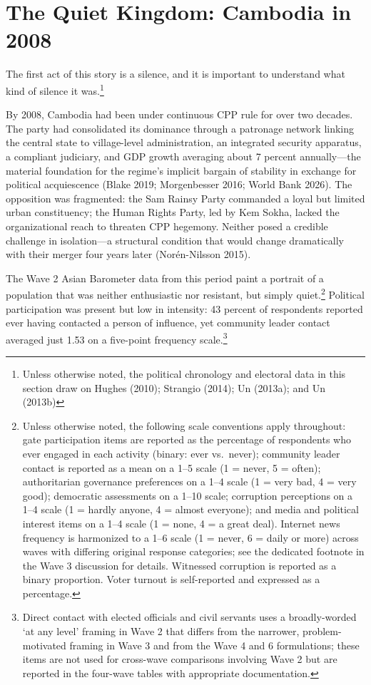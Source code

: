 \documentclass[Review,times,sageh,doublespace]{sagej}
\begin{document}
\section{The Quiet Kingdom: Cambodia in
2008}\label{the-quiet-kingdom-cambodia-in-2008}

The first act of this story is a silence, and it is important to
understand what kind of silence it was.\footnote{Unless otherwise noted,
  the political chronology and electoral data in this section draw on
  Hughes (2010); Strangio (2014); Un (2013a); and Un (2013b)}

By 2008, Cambodia had been under continuous CPP rule for over two
decades. The party had consolidated its dominance through a patronage
network linking the central state to village-level administration, an
integrated security apparatus, a compliant judiciary, and GDP growth
averaging about 7 percent annually---the material foundation for the
regime's implicit bargain of stability in exchange for political
acquiescence (Blake 2019; Morgenbesser 2016; World Bank 2026). The
opposition was fragmented: the Sam Rainsy Party commanded a loyal but
limited urban constituency; the Human Rights Party, led by Kem Sokha,
lacked the organizational reach to threaten CPP hegemony. Neither posed
a credible challenge in isolation---a structural condition that would
change dramatically with their merger four years later (Norén-Nilsson
2015).

The Wave 2 Asian Barometer data from this period paint a portrait of a
population that was neither enthusiastic nor resistant, but simply
quiet.\footnote{Unless otherwise noted, the following scale conventions
  apply throughout: gate participation items are reported as the
  percentage of respondents who ever engaged in each activity (binary:
  ever vs.~never); community leader contact is reported as a mean on a
  1--5 scale (1 = never, 5 = often); authoritarian governance
  preferences on a 1--4 scale (1 = very bad, 4 = very good); democratic
  assessments on a 1--10 scale; corruption perceptions on a 1--4 scale
  (1 = hardly anyone, 4 = almost everyone); and media and political
  interest items on a 1--4 scale (1 = none, 4 = a great deal). Internet
  news frequency is harmonized to a 1--6 scale (1 = never, 6 = daily or
  more) across waves with differing original response categories; see
  the dedicated footnote in the Wave 3 discussion for details. Witnessed
  corruption is reported as a binary proportion. Voter turnout is
  self-reported and expressed as a percentage.} Political participation
was present but low in intensity: 43 percent of respondents reported
ever having contacted a person of influence, yet community leader
contact averaged just 1.53 on a five-point frequency scale.\footnote{Direct
  contact with elected officials and civil servants uses a
  broadly-worded `at any level' framing in Wave 2 that differs from the
  narrower, problem-motivated framing in Wave 3 and from the Wave 4 and
  6 formulations; these items are not used for cross-wave comparisons
  involving Wave 2 but are reported in the four-wave tables with
  appropriate documentation.}
\end{document}

